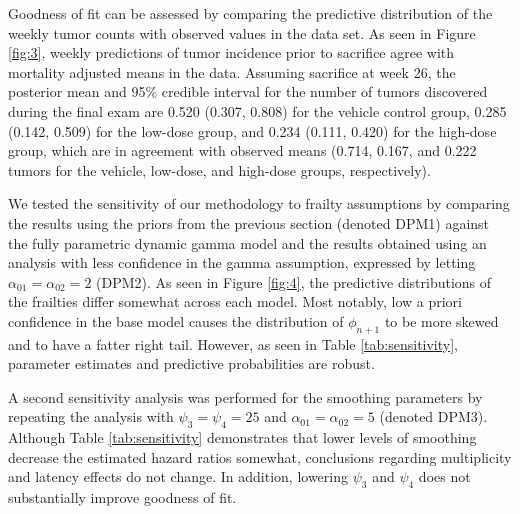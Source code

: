 \documentclass[10pt, letterpaper]{article}
\begin{document}
Goodness of fit can be assessed by comparing the predictive distribution of the weekly tumor counts with observed values in the data set. As seen in Figure \ref{fig:3}, weekly predictions of tumor incidence prior to sacrifice agree with mortality adjusted means in the data. Assuming sacrifice at week 26, the posterior mean and 95\% credible interval for the number of tumors discovered during the final exam are 0.520 (0.307, 0.808) for the vehicle control group, 0.285 (0.142, 0.509) for the low-dose group, and 0.234 (0.111, 0.420) for the high-dose group, which are in agreement with observed means (0.714, 0.167, and 0.222 tumors for the vehicle, low-dose, and high-dose groups, respectively).

We tested the sensitivity of our methodology to frailty assumptions by comparing the results using the priors from the previous section (denoted DPM1) against the fully parametric dynamic gamma model and the results obtained using an analysis with less confidence in the gamma assumption, expressed by letting $\alpha_{01} = \alpha_{02} = 2$ (DPM2). As seen in Figure \ref{fig:4}, the predictive distributions of the frailties differ somewhat across each model. Most notably, low a priori confidence in the base model causes the distribution of $\phi_{n+1}$ to be more skewed and to have a fatter right tail. However, as seen in Table \ref{tab:sensitivity}, parameter estimates and predictive probabilities are robust.

A second sensitivity analysis was performed for the smoothing parameters by repeating the analysis with $\psi_3 = \psi_4 = 25$ and $\alpha_{01} = \alpha_{02} = 5$ (denoted DPM3). Although Table \ref{tab:sensitivity} demonstrates that lower levels of smoothing decrease the estimated hazard ratios somewhat, conclusions regarding multiplicity and latency effects do not change. In addition, lowering $\psi_3$ and $\psi_4$ does not substantially improve goodness of fit.
\end{document}
